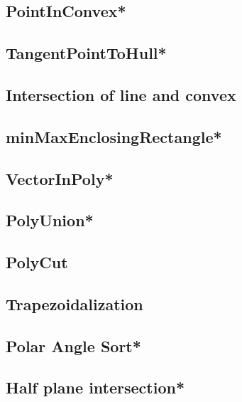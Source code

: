 \subsection{PointInConvex*} %

\subsection{TangentPointToHull*} %

\subsection{Intersection of line and convex} %

\subsection{minMaxEnclosingRectangle*} %

\subsection{VectorInPoly*} %

\subsection{PolyUnion*} %

\subsection{PolyCut}

\subsection{Trapezoidalization} %

\subsection{Polar Angle Sort*} %

\subsection{Half plane intersection*} %


